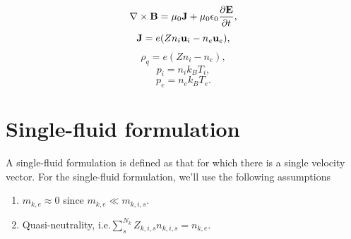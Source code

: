 \documentclass[a4paper,11pt]{report}
\begin{document}
\begin{equation}
    \label{eq:p_waves_maxwell_2}
    \nabla \times \mathbf{B} = \mu_0 \mathbf{J} + \mu_0 \epsilon_0 \frac{\partial \mathbf{E}}{\partial t},
\end{equation}
\begin{equation}
    \label{eq:p_waves_curr_density}
    \mathbf{J} = e (Z n_i \mathbf{u}_i - n_e \mathbf{u}_e),
\end{equation}
\begin{equation}
    \label{eq:p_waves_mass_density}
    \rho_q = e (Z n_i - n_e),
\end{equation}
\begin{equation}
    p_i = n_i k_B T_i,
\end{equation}
\begin{equation}
    p_e = n_e k_B T_e.
\end{equation}

\section{Single-fluid formulation}
A single-fluid formulation is defined as that for which there is a single velocity vector. For the single-fluid formulation, we'll use the following assumptions
\begin{enumerate}
    \item $m_{k,e} \approx 0$ since $m_{k,e} \ll m_{k,i,s}$. \label{eq:sf_no_e_mass} 
    \item Quasi-neutrality, i.e.\@ $\sum_s^{N_k} Z_{k,i,s} n_{k,i,s} = n_{k,e}$. \label{eq:sf_quasi_neutrality}
\end{enumerate}

\end{document}
